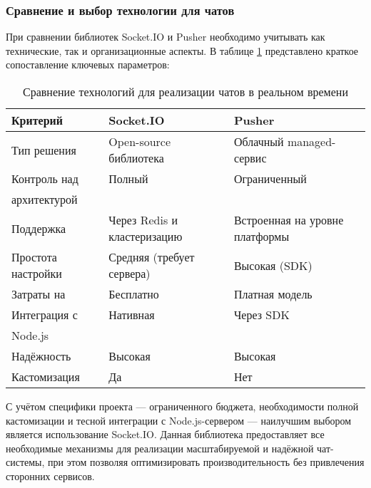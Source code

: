 \subsubsection*{Сравнение и выбор технологии для чатов}

При сравнении библиотек Socket.IO и Pusher необходимо учитывать как технические, так и организационные аспекты. В таблице \ref{tab:chat-comparison} представлено краткое сопоставление ключевых параметров:

\begin{table}[h]
  \centering
  \caption{Сравнение технологий для реализации чатов в реальном времени}
  \small
  \label{tab:chat-comparison}
  \begin{tabular}{|l|p{5cm}|p{5cm}|}
    \hline
    \textbf{Критерий} & \textbf{Socket.IO}               & \textbf{Pusher}                 \\ \hline
    Тип решения      & Open-source библиотека           & Облачный managed-сервис         \\ \hline
    Контроль над     & Полный                           & Ограниченный                    \\ 
    архитектурой     &                                  &                                 \\ \hline
    Поддержка        & Через Redis и кластеризацию      & Встроенная на уровне платформы  \\ \hline
    Простота настройки & Средняя (требует сервера)      & Высокая (SDK)                   \\ \hline
    Затраты на       & Бесплатно                        & Платная модель                  \\ \hline
    Интеграция с     & Нативная                         & Через SDK                       \\ 
    Node.js          &                                  &                                 \\ \hline
    Надёжность       & Высокая                          & Высокая                         \\ \hline
    Кастомизация     & Да                               & Нет                             \\ \hline
  \end{tabular}
\end{table}

С учётом специфики проекта — ограниченного бюджета, необходимости полной кастомизации и тесной интеграции с Node.js-сервером — наилучшим выбором является использование Socket.IO. Данная библиотека предоставляет все необходимые механизмы для реализации масштабируемой и надёжной чат-системы, при этом позволяя оптимизировать производительность без привлечения сторонних сервисов.

